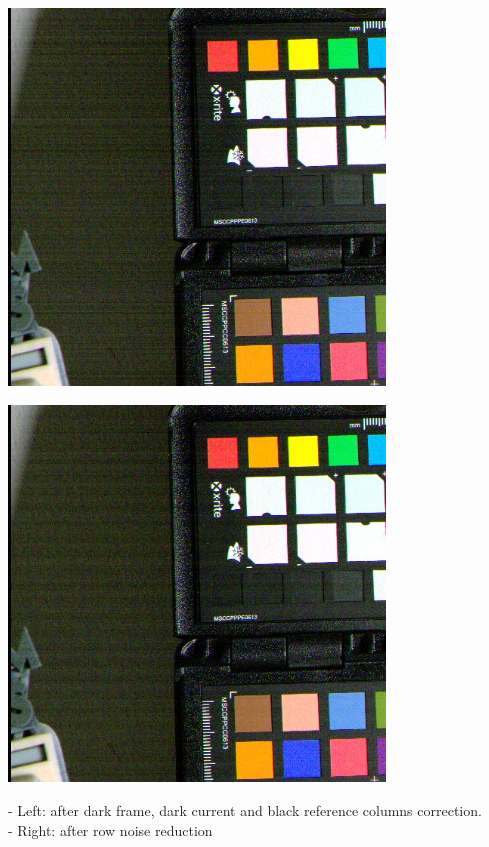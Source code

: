  \begin{center}
\includegraphics[height=10cm]{images/10ms+4-no-blackcol-rn-crop}
\end{center}

\begin{center}
\includegraphics[height=10cm]{images/10ms+4-no-blackcol-ff-crop}
\end{center}

- Left: after dark frame, dark current and black reference columns correction.\\
- Right: after row noise reduction  \\

